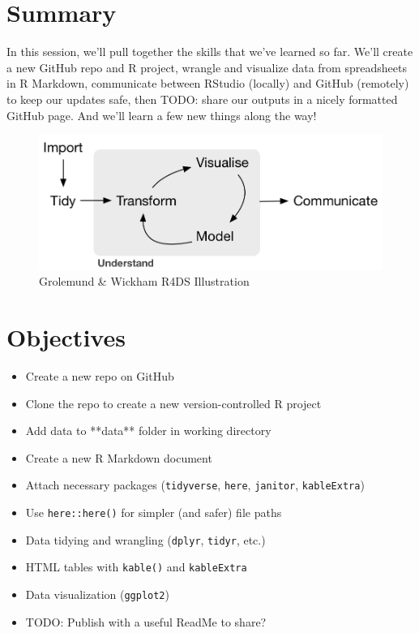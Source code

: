 \documentclass[]{book}
\providecommand{\tightlist}{%
  \setlength{\itemsep}{0pt}\setlength{\parskip}{0pt}}
\begin{document}
\hypertarget{summary-7}{%
\section{Summary}\label{summary-7}}

In this session, we'll pull together the skills that we've learned so far. We'll create a new GitHub repo and R project, wrangle and visualize data from spreadsheets in R Markdown, communicate between RStudio (locally) and GitHub (remotely) to keep our updates safe, then TODO: share our outputs in a nicely formatted GitHub page. And we'll learn a few new things along the way!

\begin{figure}
\centering
\includegraphics{img/r4ds_data-science.png}
\caption{Grolemund \& Wickham R4DS Illustration}
\end{figure}

\hypertarget{objectives-7}{%
\section{Objectives}\label{objectives-7}}

\begin{itemize}
\tightlist
\item
  Create a new repo on GitHub
\item
  Clone the repo to create a new version-controlled R project
\item
  Add data to **data** folder in working directory
\item
  Create a new R Markdown document
\item
  Attach necessary packages (\texttt{tidyverse}, \texttt{here}, \texttt{janitor}, \texttt{kableExtra})
\item
  Use \texttt{here::here()} for simpler (and safer) file paths
\item
  Data tidying and wrangling (\texttt{dplyr}, \texttt{tidyr}, etc.)
\item
  HTML tables with \texttt{kable()} and \texttt{kableExtra}
\item
  Data visualization (\texttt{ggplot2})
\item
  TODO: Publish with a useful ReadMe to share?
\end{itemize}
\end{document}
